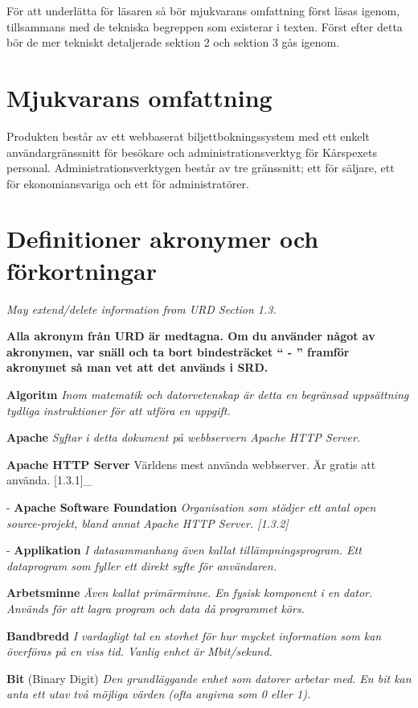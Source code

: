 \documentclass[a4paper, twoside, 11pt, titlepage]{article}
\begin{document}
För att underlätta för  läsaren så bör mjukvarans omfattning först läsas igenom, tillsammans med de tekniska begreppen som existerar i texten. Först efter detta bör de mer tekniskt detaljerade sektion 2 och sektion 3 gås igenom.

\clearpage
\section{Mjukvarans omfattning}


Produkten består av ett webbaserat biljettbokningssystem med ett enkelt användargränssnitt för besökare och administrationsverktyg för Kårspexets personal. Administrationsverktygen består av tre gränssnitt; ett för säljare, ett för ekonomiansvariga och ett för administratörer.

\clearpage
\section{Definitioner akronymer och förkortningar}


\emph{May extend/delete information from URD Section 1.3.}

\textbf{Alla akronym från URD är medtagna. Om du använder något av akronymen, var snäll och ta bort bindesträcket `` - '' framför akronymet så man vet att det används i SRD.}

\textbf{Algoritm} \emph{Inom matematik och datorvetenskap är detta en begränsad uppsättning tydliga instruktioner för att utföra en uppgift.}

\textbf{Apache} \emph{Syftar i detta dokument på webbservern Apache HTTP Server.}

\textbf{Apache HTTP Server} Världens mest använda webbserver. Är gratis att använda. [1.3.1]\_

- \textbf{Apache Software Foundation} \emph{Organisation som stödjer ett antal open source-projekt, bland annat Apache HTTP Server. [1.3.2]}

- \textbf{Applikation} \emph{I datasammanhang även kallat tillämpningsprogram. Ett dataprogram som fyller ett direkt syfte för användaren.}

\textbf{Arbetsminne} \emph{Även kallat primärminne. En fysisk komponent i en dator. Används för att lagra program och data då programmet körs.}

\textbf{Bandbredd} \emph{I vardagligt tal en storhet för hur mycket information som kan överföras på en viss tid. Vanlig enhet är Mbit/sekund.}

\textbf{Bit} (Binary Digit) \emph{Den grundläggande enhet som datorer arbetar med. En bit kan anta ett utav två möjliga värden (ofta angivna som 0 eller 1).}
\end{document}
